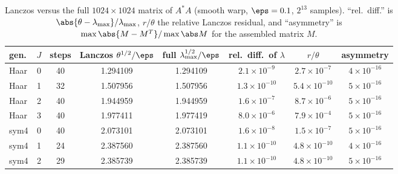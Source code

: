 \begin{table}[h]\centering\small
\begin{tabular}{lccccccc}\toprule
gen. & $J$ & steps & Lanczos $\theta^{1/2}/\eps$ & full $\lambda_{\max}^{1/2}/\eps$ & rel.\ diff.\ of $\lambda$ & $r/\theta$ & asymmetry\\\midrule
Haar & 0 & 40 & 1.294109 & 1.294109 & $2.1\times10^{-9}$ & $2.7\times10^{-7}$ & $4\times10^{-16}$\\
Haar & 1 & 32 & 1.507956 & 1.507956 & $1.3\times10^{-10}$ & $5.4\times10^{-10}$ & $5\times10^{-16}$\\
Haar & 2 & 40 & 1.944959 & 1.944959 & $1.6\times10^{-7}$ & $8.7\times10^{-6}$ & $5\times10^{-16}$\\
Haar & 3 & 40 & 1.977411 & 1.977419 & $8.0\times10^{-6}$ & $7.9\times10^{-4}$ & $5\times10^{-16}$\\
sym4 & 0 & 40 & 2.073101 & 2.073101 & $1.6\times10^{-8}$ & $1.5\times10^{-7}$ & $5\times10^{-16}$\\
sym4 & 1 & 24 & 2.387560 & 2.387560 & $1.1\times10^{-10}$ & $4.8\times10^{-10}$ & $4\times10^{-16}$\\
sym4 & 2 & 29 & 2.385739 & 2.385739 & $1.1\times10^{-10}$ & $4.8\times10^{-10}$ & $5\times10^{-16}$\\\bottomrule
\end{tabular}
\caption{Lanczos versus the full $1024\times1024$ matrix of $A^*A$ (smooth warp, $\eps=0.1$, $2^{13}$ samples). ``rel.\ diff.'' is $\abs{\theta-\lambda_{\max}}/\lambda_{\max}$, $r/\theta$ the relative Lanczos residual, and ``asymmetry'' is $\max\abs{M-M^T}/\max\abs M$ for the assembled matrix $M$.}\label{tab:lzfull}
\end{table}
